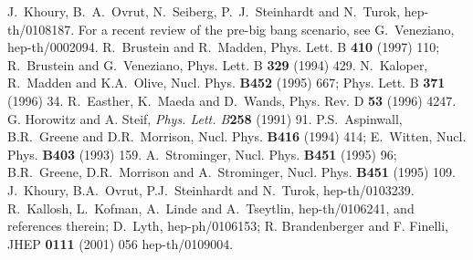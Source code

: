 \documentclass[a4paper,12pt,oneside]{article}
\begin{document}
\begin{thebibliography}{99}
 J.~Khoury, B.~A.~Ovrut, N.~Seiberg,
P.~J.~Steinhardt and N.~Turok, hep-th/0108187.
 For a recent review of the pre-big bang scenario,
see G.~Veneziano, hep-th/0002094.
 R.~Brustein and R.~Madden,
Phys. Lett. B {\bf 410} (1997) 110; R.~Brustein and G.~Veneziano,
Phys. Lett. B {\bf 329} (1994) 429. N.~Kaloper, R.~Madden and
K.A.~Olive, Nucl. Phys. {\bf B452} (1995) 667; Phys. Lett. B {\bf
371} (1996) 34.  R.~Easther, K.~Maeda and D.~Wands, Phys. Rev. D
{\bf 53} (1996) 4247.
 G. Horowitz and A. Steif, {\it Phys. Lett. B}{\bf 258}
(1991) 91.
 P.S.~Aspinwall, B.R.~Greene and D.R.~Morrison,
Nucl. Phys. {\bf B416} (1994) 414; E.~Witten, Nucl. Phys. {\bf
B403} (1993) 159.
 A.~Strominger, Nucl. Phys. {\bf B451} (1995) 96;
B.R.~Greene, D.R.~Morrison and A.~Strominger, Nucl. Phys. {\bf
B451} (1995) 109.
 J.~Khoury, B.A.~Ovrut,
P.J.~Steinhardt and N.~Turok, hep-th/0103239.
 R.~Kallosh, L.~Kofman, A.~Linde and A.~Tseytlin,
hep-th/0106241, and references therein; D.~Lyth, hep-ph/0106153;
R. Brandenberger and F. Finelli, JHEP {\bf 0111} (2001) 056
hep-th/0109004.

\end{thebibliography}
\end{document}
